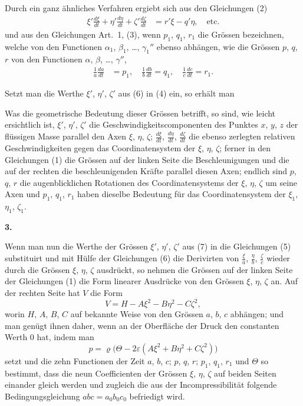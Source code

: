 \documentclass[12pt,a4paper]{article}
\begin{document}
Durch ein ganz \"ahnliches Verfahren ergiebt sich aus den Gleichungen (2)
\begin{align*}
\xi' \frac{d\xi}{dt} + \eta' \frac{d\eta}{dt} + \zeta' \frac{d\zeta}{dt} &= r'\xi - q'\eta,\quad\text{etc.}\tag{5}
\end{align*}
und aus den Gleichungen Art.~1, (3), wenn $p_{1}$, $q_{1}$, $r_{1}$ die Gr\"ossen bezeichnen, welche von den Functionen $\alpha_{1}$, $\beta_{1}$, \dots, $\gamma_{1}''$ ebenso abh\"angen, wie die Gr\"ossen $p$, $q$, $r$ von den Functionen $\alpha$, $\beta$, \dots, $\gamma''$,
\begin{align*}
\frac{1}{a}\frac{da}{dt} &= p_{1},\quad \frac{1}{b}\frac{db}{dt} = q_{1},\quad \frac{1}{c}\frac{dc}{dt} = r_{1}.\tag{6}
\end{align*}

Setzt man die Werthe $\xi'$, $\eta'$, $\zeta'$ aus (6) in (4) ein, so erh\"alt man

Was die geometrische Bedeutung dieser Gr\"ossen betrifft, so sind, wie leicht ersichtlich ist, $\xi'$, $\eta'$, $\zeta'$ die Geschwindigkeitscomponenten des Punktes $x$, $y$, $z$ der fl\"ussigen Masse parallel den Axen $\xi$, $\eta$, $\zeta$; $\frac{d\xi}{dt}$, $\frac{d\eta}{dt}$, $\frac{d\zeta}{dt}$ die ebenso zerlegten relativen Geschwindigkeiten gegen das Coordinatensystem der $\xi$, $\eta$, $\zeta$; ferner in den Gleichungen (1) die Gr\"ossen auf der linken Seite die Beschleunigungen und die auf der rechten die beschleunigenden Kr\"afte parallel diesen Axen; endlich sind $p$, $q$, $r$ die augenblicklichen Rotationen des Coordinatensystems der $\xi$, $\eta$, $\zeta$ um seine Axen und $p_{1}$, $q_{1}$, $r_{1}$ haben dieselbe Bedeutung f\"ur das Coordinatensystem der $\xi_{1}$, $\eta_{1}$, $\zeta_{1}$.

\begin{center}
\textbf{3.}
\end{center}

Wenn man nun die Werthe der Gr\"ossen $\xi'$, $\eta'$, $\zeta'$ aus (7) in die Gleichungen (5) substituirt und mit H\"ulfe der Gleichungen (6) die Derivirten von $\frac{\xi}{a}$, $\frac{\eta}{b}$, $\frac{\zeta}{c}$ wieder durch die Gr\"ossen $\xi$, $\eta$, $\zeta$ ausdr\"uckt, so nehmen die Gr\"ossen auf der linken Seite der Gleichungen (1) die Form linearer Ausdr\"ucke von den Gr\"ossen $\xi$, $\eta$, $\zeta$ an. Auf der rechten Seite hat $V$ die Form
\[
V = H - A\xi^{2} - B\eta^{2} - C\zeta^{2},
\]
worin $H$, $A$, $B$, $C$ auf bekannte Weise von den Gr\"ossen $a$, $b$, $c$ abh\"angen; und man gen\"ugt ihnen daher, wenn an der Oberfl\"ache der Druck den constanten Werth $0$ hat, indem man
\[
p = \varrho\bigl(\Theta - 2\varepsilon(A\xi^{2} + B\eta^{2} + C\zeta^{2})\bigr)
\]
setzt und die zehn Functionen der Zeit $a$, $b$, $c$; $p$, $q$, $r$; $p_{1}$, $q_{1}$, $r_{1}$ und $\Theta$ so bestimmt, dass die neun Coefficienten der Gr\"ossen $\xi$, $\eta$, $\zeta$ auf beiden Seiten einander gleich werden und zugleich die aus der Incompressibilit\"at folgende Bedingungsgleichung $abc = a_{0}b_{0}c_{0}$ befriedigt wird.
\end{document}
